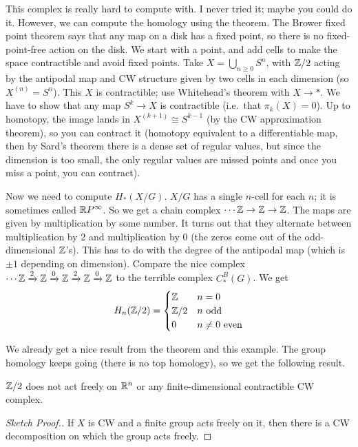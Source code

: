\begin{example}[$G=\ZZ/2$]
 This complex is really hard to compute with. I never tried it; maybe you could do it. However, we can compute the homology using the theorem. The Brower fixed point theorem says that any map on a disk has a fixed point, so there is no fixed-point-free action on the disk. We start with a point, and add cells to make the space contractible and avoid fixed points. Take $X=\bigcup_{n\ge 0} S^n$, with $\mathbb{Z}/2$ acting by the antipodal map and CW structure given by two cells in each dimension (so $X^{(n)}=S^n$). This $X$ is contractible; use Whitehead's theorem with $X\to *$. We have to show that any map $S^k\to X$ is contractible (i.e.~that $\pi_k(X)=0$). Up to homotopy, the image lands in $X^{(k+1)}\cong S^{k-1}$ (by the CW approximation theorem), so you can contract it (homotopy equivalent to a differentiable map, then by Sard's theorem there is a dense set of regular values, but since the dimension is too small, the only regular values are missed points and once you miss a point, you can contract).
 
 Now we need to compute $H_*(X/G)$. $X/G$ has a single $n$-cell for each $n$; it is sometimes called $\mathbb{R} P^\infty$. So we get a chain complex $\cdots \mathbb{Z}\to \mathbb{Z}\to \mathbb{Z}$. The maps are given by multiplication by some number. It turns out that they alternate between multiplication by 2 and multiplication by 0 (the zeros come out of the odd-dimensional $\mathbb{Z}$'s). This has to do with the degree of the antipodal map (which is $\pm 1$ depending on dimension). Compare the nice complex $\cdots \mathbb{Z}\xrightarrow 2 \mathbb{Z}\xrightarrow 0 \mathbb{Z}\xrightarrow 2 \mathbb{Z} \xrightarrow 0 \mathbb{Z}$ to the terrible complex $C^B_*(G)$. We get 
 \[
  H_n(\mathbb{Z}/2)=\begin{cases}
   \mathbb{Z} & n=0\\
   \mathbb{Z}/2 & n \text{ odd}\\
   0 & n\neq 0 \text{ even}
  \end{cases}
 \]
\end{example}
We already get a nice result from the theorem and this example. The group homology keeps going (there is no top homology), so we get the following result.
\begin{corollary}
 $\mathbb{Z}/2$ does not act freely on $\mathbb{R}^n$ or any finite-dimensional contractible CW complex.
\end{corollary}
\begin{proof}[Sketch Proof.]
 If $X$ is CW and a finite group acts freely on it, then there is a CW decomposition on which the group acts freely.
\end{proof}
